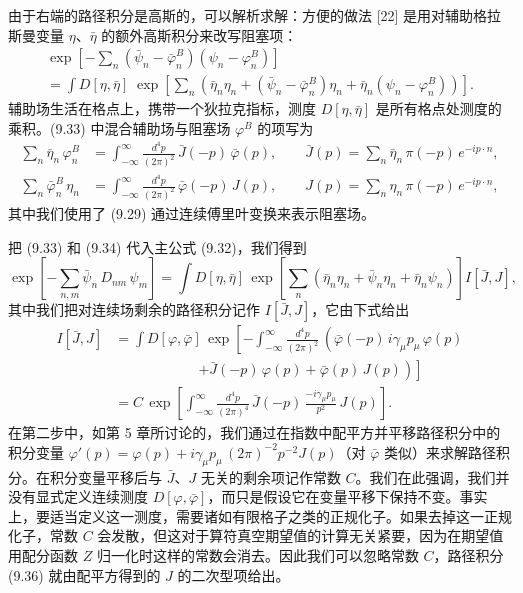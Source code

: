 由于右端的路径积分是高斯的，可以解析求解：方便的做法 [22] 是用对辅助格拉斯曼变量 $\eta$、$\bar\eta$ 的额外高斯积分来改写阻塞项：
\begin{multline}
  \exp\!\left[-\sum_n\left(\bar\psi_n-\bar\varphi^B_n\right)
    \left(\psi_n-\varphi^B_n\right)\right] \\
  = \int D[\eta,\bar\eta]\;
    \exp\!\left[\sum_n\left(\bar\eta_n\eta_n
      + \left(\bar\psi_n-\bar\varphi^B_n\right)\eta_n
      + \bar\eta_n\left(\psi_n-\varphi^B_n\right)\right)\right] .
\end{multline}
辅助场生活在格点上，携带一个狄拉克指标，测度 $D[\eta,\bar\eta]$ 是所有格点处测度的乘积。(9.33) 中混合辅助场与阻塞场 $\varphi^B$ 的项写为
\begin{align}
  \sum_n\bar\eta_n\,\varphi^B_n
  &= \int_{-\infty}^{\infty}\frac{d^4p}{(2\pi)^2}\,\bar J(-p)\,\bar\varphi(p) , \qquad
    \bar J(p) = \sum_n\bar\eta_n\,\pi(-p)\,e^{-ip\cdot n} , \nonumber\\
  \sum_n\bar\varphi^B_n\,\eta_n
  &= \int_{-\infty}^{\infty}\frac{d^4p}{(2\pi)^2}\,\bar\varphi(-p)\,J(p) , \qquad
    J(p) = \sum_n\eta_n\,\pi(-p)\,e^{-ip\cdot n} ,
\end{align}
其中我们使用了 (9.29) 通过连续傅里叶变换来表示阻塞场。

把 (9.33) 和 (9.34) 代入主公式 (9.32)，我们得到
\begin{equation}
  \exp\!\left[-\sum_{n,m}\bar\psi_n\,D_{nm}\,\psi_m\right]
  = \int D[\eta,\bar\eta]\,
    \exp\!\left[\sum_n\left(\bar\eta_n\eta_n + \bar\psi_n\eta_n + \bar\eta_n\psi_n\right)\right]
    I[\bar J,J] ,
\end{equation}
其中我们把对连续场剩余的路径积分记作 $I[\bar J,J]$，它由下式给出
\begin{equation}
  \begin{split}
    I[\bar J,J]
    &= \int D[\varphi,\bar\varphi]\,
      \exp\!\left[-\int_{-\infty}^{\infty}\frac{d^4p}{(2\pi)^2}\,
        \left(\bar\varphi(-p)\,i\gamma_\mu p_\mu\,\varphi(p)\right.\right. \\
    &\qquad\qquad\qquad
        \left.\left.+ \bar J(-p)\,\varphi(p) + \bar\varphi(p)\,J(p)\right)\right] \\
    &= C\,\exp\!\left[\int_{-\infty}^{\infty}\frac{d^4p}{(2\pi)^4}\,
        \bar J(-p)\,\frac{-i\gamma_\mu p_\mu}{p^2}\,J(p)\right] .
  \end{split}
\end{equation}
在第二步中，如第 5 章所讨论的，我们通过在指数中配平方并平移路径积分中的积分变量 $\varphi'(p) = \varphi(p) + i\gamma_\mu p_\mu\,(2\pi)^{-2}p^{-2}J(p)$（对 $\bar\varphi$ 类似）来求解路径积分。在积分变量平移后与 $\bar J$、$J$ 无关的剩余项记作常数 $C$。我们在此强调，我们并没有显式定义连续测度 $D[\varphi,\bar\varphi]$，而只是假设它在变量平移下保持不变。事实上，要适当定义这一测度，需要诸如有限格子之类的正规化子。如果去掉这一正规化子，常数 $C$ 会发散，但这对于算符真空期望值的计算无关紧要，因为在期望值用配分函数 $Z$ 归一化时这样的常数会消去。因此我们可以忽略常数 $C$，路径积分 (9.36) 就由配平方得到的 $J$ 的二次型项给出。

